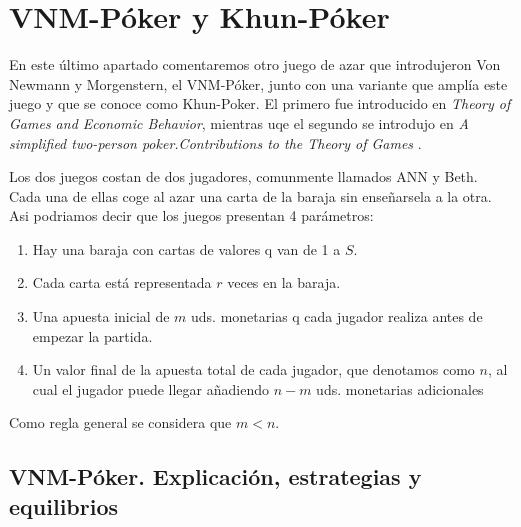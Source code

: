 \documentclass[12pt,a4paper,]{book}
\def\ifdoblecara{} %
\numberwithin{dummy}{section}
\theoremstyle{ocrenumbox}
\theoremstyle{blacknumex}
\theoremstyle{blacknumbox}
\theoremstyle{ocrenum}
\theoremstyle{ocrenum}
\begin{document}
\fi

\ifdefined\ifdoblecara
\fancyhead{}{}
\fancyhead[LE,RO]{\scriptsize\rightmark}
\fancyfoot[LO,RE]{\scriptsize\slshape \leftmark}
\fancyfoot[C]{}
\fancyfoot[LE,RO]{\footnotesize\thepage}
\else
\fancyhead{}{}
\fancyhead[RO]{\scriptsize\rightmark}
\fancyfoot[LO]{\scriptsize\slshape \leftmark}
\fancyfoot[C]{}
\fancyfoot[RO]{\footnotesize\thepage}
\fi

\renewcommand{\headrulewidth}{0.4pt}
\renewcommand{\footrulewidth}{0.4pt}

\hypertarget{Seccion5}{%
\chapter{VNM-Póker y Khun-Póker}\label{Seccion5}}

En este último apartado comentaremos otro juego de azar que introdujeron
Von Newmann y Morgenstern, el VNM-Póker, junto con una variante que
amplía este juego y que se conoce como Khun-Poker. El primero fue
introducido en \emph{Theory of Games and Economic Behavior}, mientras
uqe el segundo se introdujo en \emph{A simplified two-person
poker.Contributions to the Theory of Games} .

Los dos juegos costan de dos jugadores, comunmente llamados ANN y Beth.
Cada una de ellas coge al azar una carta de la baraja sin enseñarsela a
la otra. Asi podriamos decir que los juegos presentan 4 parámetros:

\begin{enumerate}
\def\labelenumi{\arabic{enumi}.}
\item
  Hay una baraja con cartas de valores q van de 1 a \(S\).
\item
  Cada carta está representada \(r\) veces en la baraja.
\item
  Una apuesta inicial de \(m\) uds. monetarias q cada jugador realiza
  antes de empezar la partida.
\item
  Un valor final de la apuesta total de cada jugador, que denotamos como
  \(n\), al cual el jugador puede llegar añadiendo \(n-m\) uds.
  monetarias adicionales
\end{enumerate}

Como regla general se considera que \(m<n\).

\hypertarget{Seccion51}{%
\section{VNM-Póker. Explicación, estrategias y
equilibrios}\label{Seccion51}}
\end{document}
